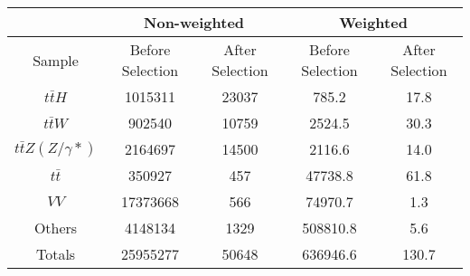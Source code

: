 \begin{table}[ht!]
    \centering
    \begin{tabular}{|c|c|c|c|c|}
        \hline
         & \multicolumn{2}{c|}{Non-weighted} & \multicolumn{2}{c|}{Weighted} \\ \hline 
        Sample & Before Selection & After Selection & Before Selection & After Selection \\ \hline
        $t\bar{t}H$ & 1015311 & 23037 & 785.2 & 17.8 \\ \hline
        $t\bar{t}W$ & 902540 & 10759 & 2524.5 & 30.3 \\ \hline
        $t\bar{t}Z(Z/\gamma*)$ & 2164697 & 14500 & 2116.6 & 14.0 \\ \hline
        $t\bar{t}$ & 350927 & 457 & 47738.8 & 61.8 \\ \hline
        $VV$ & 17373668 & 566 & 74970.7 & 1.3 \\ \hline
        Others & 4148134 & 1329 & 508810.8 & 5.6 \\ \hline\hline
        Totals & 25955277 & 50648 & 636946.6 & 130.7 \\ \hline
    \end{tabular}
\end{table}